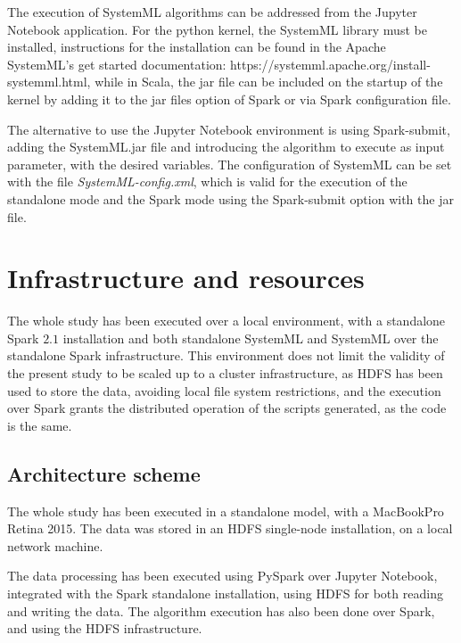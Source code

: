 \documentclass[11pt]{book} %
\begin{document}
    The execution of SystemML algorithms can be addressed from the Jupyter Notebook application. For the python kernel, the SystemML library must be installed, instructions for the installation can be found in the Apache SystemML's get started documentation: https://systemml.apache.org/install-systemml.html, while in Scala, the jar file can be included on the startup of the kernel by adding it to the jar files option of Spark or via Spark configuration file.

    The alternative to use the Jupyter Notebook environment is using Spark-submit, adding the SystemML.jar file and introducing the algorithm to execute as input parameter, with the desired variables. The configuration of SystemML can be set with the file \emph{SystemML-config.xml}, which is valid for the execution of the standalone mode and the Spark mode using the Spark-submit option with the jar file.

\chapter{Infrastructure and resources}
  \label{sec:infrastructure_and_resources}

  The whole study has been executed over a local environment, with a standalone Spark $2.1$ installation and both standalone SystemML and SystemML over the standalone Spark infrastructure. This environment does not limit the validity of the present study to be scaled up to a cluster infrastructure, as HDFS has been used to store the data, avoiding local file system restrictions, and the execution over Spark grants the distributed operation of the scripts generated, as the code is the same.

  \section{Architecture scheme}

    The whole study has been executed in a standalone model, with a MacBookPro Retina 2015. The data was stored in an HDFS single-node installation, on a local network machine.

    The data processing has been executed using PySpark over Jupyter Notebook, integrated with the Spark standalone installation, using HDFS for both reading and writing the data. The algorithm execution has also been done over Spark, and using the HDFS infrastructure.
\end{document}
